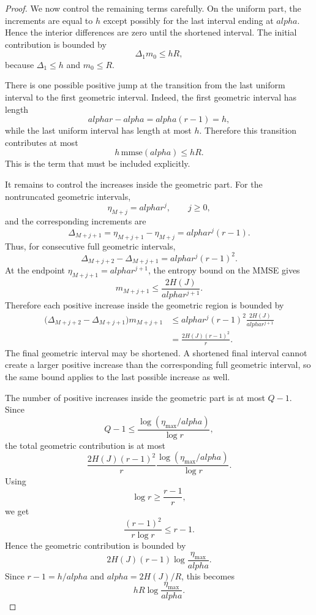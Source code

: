 \documentclass[10pt,a4paper]{amsart}
\def\alpha{alpha}%
\newcommand{\mmse}{\mathrm{mmse}}
\begin{document}
\begin{proof}
We now control the remaining terms carefully. On the uniform part, the increments are equal to $h$ except possibly for the last interval ending at $\alpha$. Hence the interior differences are zero until the shortened interval. The initial contribution is bounded by
\[
    \Delta_1m_0\le hR,
\]
because $\Delta_1\le h$ and $m_0\le R$.

There is one possible positive jump at the transition from the last uniform interval to the first geometric interval. Indeed, the first geometric interval has length
\[
    \alpha r-\alpha=\alpha(r-1)=h,
\]
while the last uniform interval has length at most $h$. Therefore this transition contributes at most
\[
    h\,\mmse(\alpha)\le hR.
\]
This is the term that must be included explicitly.

It remains to control the increases inside the geometric part. For the nontruncated geometric intervals,
\[
    \eta_{M+j}=\alpha r^j,
    \qquad
    j\ge 0,
\]
and the corresponding increments are
\[
    \Delta_{M+j+1}
    =
    \eta_{M+j+1}-\eta_{M+j}
    =
    \alpha r^j(r-1).
\]
Thus, for consecutive full geometric intervals,
\[
    \Delta_{M+j+2}-\Delta_{M+j+1}
    =
    \alpha r^j(r-1)^2 .
\]
At the endpoint $\eta_{M+j+1}=\alpha r^{j+1}$, the entropy bound on the MMSE gives
\[
    m_{M+j+1}
    \le
    \frac{2H(J)}{\alpha r^{j+1}} .
\]
Therefore each positive increase inside the geometric region is bounded by
\[
\begin{aligned}
    \bigl(\Delta_{M+j+2}-\Delta_{M+j+1}\bigr)m_{M+j+1}
    &\le
    \alpha r^j(r-1)^2
    \frac{2H(J)}{\alpha r^{j+1}}  \\
    &=
    \frac{2H(J)(r-1)^2}{r}.
\end{aligned}
\]
The final geometric interval may be shortened. A shortened final interval cannot create a larger positive increase than the corresponding full geometric interval, so the same bound applies to the last possible increase as well.

The number of positive increases inside the geometric part is at most $Q-1$. Since
\[
    Q-1
    \le
    \frac{\log(\eta_{\max}/\alpha)}{\log r},
\]
the total geometric contribution is at most
\[
    \frac{2H(J)(r-1)^2}{r}
    \frac{\log(\eta_{\max}/\alpha)}{\log r}.
\]
Using
\[
    \log r\ge \frac{r-1}{r},
\]
we get
\[
    \frac{(r-1)^2}{r\log r}
    \le r-1.
\]
Hence the geometric contribution is bounded by
\[
    2H(J)(r-1)
    \log\frac{\eta_{\max}}{\alpha}.
\]
Since $r-1=h/\alpha$ and $\alpha=2H(J)/R$, this becomes
\[
    hR\log\frac{\eta_{\max}}{\alpha}.
\]


\end{proof}
\end{document}
